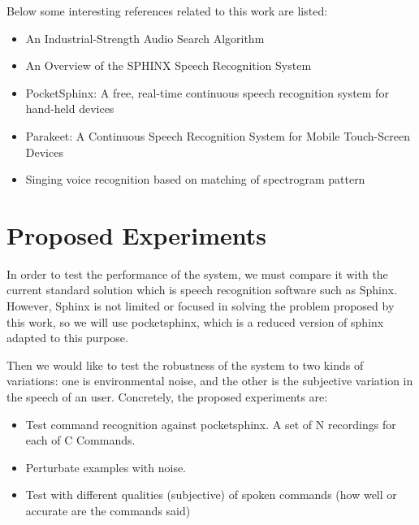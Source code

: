 \documentclass[anon]{CI}
\begin{document}
Below some interesting references related to this work are listed:
	\begin{itemize}
		\item An Industrial-Strength Audio Search Algorithm \cite{shazam}
		\item An Overview of the SPHINX Speech Recognition System \cite{sphinx}
		\item PocketSphinx: A free, real-time continuous speech recognition system for hand-held devices \cite{pocketsphinx}
		\item Parakeet: A Continuous Speech Recognition System for Mobile Touch-Screen Devices \cite{parakeet}
		\item Singing voice recognition based on matching of spectrogram pattern \cite{singingspeech}
	\end{itemize}


\section{Proposed Experiments}
In order to test the performance of the system, we must compare it with the current standard solution which is speech recognition software such as Sphinx. However, Sphinx is not limited or focused in solving the problem proposed by this work, so we will use pocketsphinx, which is a reduced version of sphinx adapted to this purpose.

Then we would like to test the robustness of the system to two kinds of variations:
one is environmental noise, and the other is the subjective variation in the speech of an user.
Concretely, the proposed experiments are:
	\begin{itemize}
		\item  Test command recognition against pocketsphinx. A set of N recordings for each of C Commands.
		\item Perturbate examples with noise.
		\item Test with different qualities (subjective) of spoken commands (how well or accurate are the commands said)
	\end{itemize}
\end{document}
